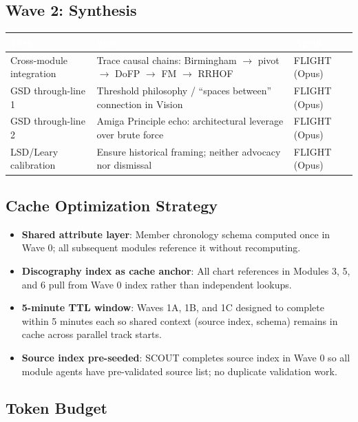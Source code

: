 \documentclass[11pt,letterpaper]{article}
\newcommand{\tableheader}[1]{\textbf{\sffamily\textcolor{white}{#1}}}
\begin{document}
\subsection{Wave 2: Synthesis}

\begin{center}
\begin{tabularx}{\textwidth}{L{3cm}XC{2.5cm}}
\toprule
{}
\tableheader{Task} & \tableheader{Spec} & \tableheader{Agent} \\
\midrule
Cross-module integration & Trace causal chains: Birmingham $\to$ pivot $\to$ DoFP $\to$ FM $\to$ RRHOF & FLIGHT (Opus) \\
GSD through-line 1 & Threshold philosophy / ``spaces between'' connection in Vision & FLIGHT (Opus) \\
GSD through-line 2 & Amiga Principle echo: architectural leverage over brute force & FLIGHT (Opus) \\
LSD/Leary calibration & Ensure historical framing; neither advocacy nor dismissal & FLIGHT (Opus) \\
\bottomrule
\end{tabularx}
\end{center}

\subsection{Cache Optimization Strategy}

\begin{itemize}[leftmargin=*]
  \item \textbf{Shared attribute layer}: Member chronology schema computed once in Wave 0; all subsequent modules reference it without recomputing.
  \item \textbf{Discography index as cache anchor}: All chart references in Modules 3, 5, and 6 pull from Wave 0 index rather than independent lookups.
  \item \textbf{5-minute TTL window}: Waves 1A, 1B, and 1C designed to complete within 5 minutes each so shared context (source index, schema) remains in cache across parallel track starts.
  \item \textbf{Source index pre-seeded}: SCOUT completes source index in Wave 0 so all module agents have pre-validated source list; no duplicate validation work.
\end{itemize}

\subsection{Token Budget}
\end{document}
